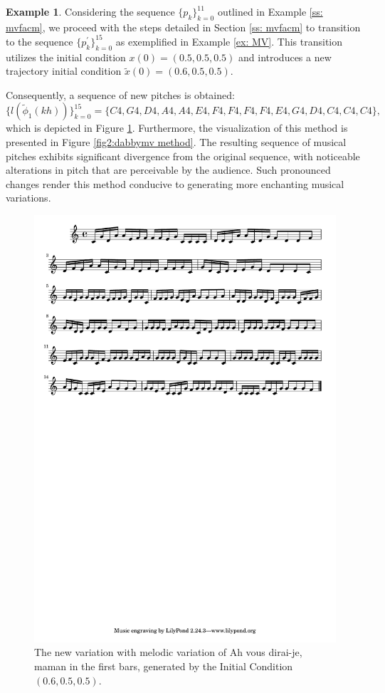 \documentclass[11pt]{article}
\theoremstyle{definition}
\newtheorem{example}[theorem]{Example}
\begin{document}
\begin{example}
Considering the sequence $\{p_k\}_{k=0}^{11}$ outlined in Example \ref{ss: mvfacm}, we proceed with the steps detailed in Section \ref{ss: mvfacm} to transition to the sequence $\{p^\prime_k\}_{k=0}^{15}$ as exemplified in Example \ref{ex: MV}. 
This transition utilizes the initial condition $x(0) = (0.5,0.5,0.5)$ and introduces a new trajectory initial condition $\tilde{x}(0) = (0.6,0.5,0.5)$.

Consequently, a sequence of new pitches is obtained:
\[ \{l(\tilde{\phi}_1(kh))\}_{k = 0}^{15} = \{C4, G4, D4, A4, A4, E4, F4, F4, F4, F4, E4, G4, D4, C4, C4, C4 \}, \]
which is depicted in Figure \ref{fig:DabbyER}. Furthermore, the visualization of this method is presented in Figure \ref{fig2:dabbymv method}. 
The resulting sequence of musical pitches exhibits significant divergence from the original sequence, with noticeable alterations in pitch that are perceivable by the audience. 
Such pronounced changes render this method conducive to generating more enchanting musical variations.
\end{example}

\begin{figure}
\centering
\includegraphics[trim=1cm 27.5cm 8.65cm 0.5cm, clip, scale=0.8]{dabby_melody_variation.pdf}
\caption{The new variation with melodic variation of Ah vous dirai-je, maman in the first bars, generated by the Initial Condition $(0.6, 0.5, 0.5)$.} 
\label{fig:DabbyER}
\end{figure}
\end{document}
